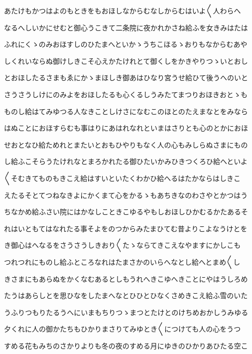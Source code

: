 \documentclass[a4paper,11pt,landscape]{ltjtarticle}
\begin{document}
\par\medskip
あたけもかつはよのもときをもおほしなからむなしからむはいよ〱人わらへ
\par\medskip
なるへしいかにせむと御心うこきて二条院に夜かれかさね給ふを女きみはたは
\par\medskip
ふれにくゝのみおほすしのひたまへといかゝうちこほるゝおりもなからむあや
\par\medskip
しくれいならぬ御けしきこそ心えかたけれとて御くしをかきやりつゝいとおし
\par\medskip
とおほしたるさまもゑにかゝまほしき御あはひなり宮うせ給ひて後うへのいと
\par\medskip
さうさうしけにのみよをおほしたるも心くるしうみたてまつりおほきおとゝも
\par\medskip
ものし給はてみゆつる人なきことしけさになむこのほとのたえまなとをみなら
\par\medskip
はぬことにおほすらむも事はりにあはれなれといまはさりとも心のとかにおほ
\par\medskip
せおとなひ給ためれとまたいとおもひやりもなく人の心もみしらぬさまにもの
\par\medskip
し給ふこそらうたけれなとまろかれたる御ひたいかみひきつくろひ給へといよ
\par\medskip
〱そむきてものもきこえ給はすいといたくわかひ給へるはたかならはしきこ
\par\medskip
えたるそとてつねなきよにかくまて心をかるゝもあちきなのわさやとかつはう
\par\medskip
ちなかめ給ふさい院にはかなしこときこゆるやもしおほしひかむるかたあるそ
\par\medskip
れはいともてはなれたる事そよをのつからみたまひてむ昔よりこよなうけとを
\par\medskip
き御心はへなるをさうさうしきおり〱たゝならてきこえなやますにかしこも
\par\medskip
つれつれにものし給ふところなれはたまさかのいらへなとし給へとまめ〱し
\par\medskip
きさまにもあらぬをかくなむあるとしもうれへきこゆへきことにやはうしろめ
\par\medskip
たうはあらしとを思ひなをしたまへなとひひとひなくさめきこえ給ふ雪のいた
\par\medskip
うふりつもりたるうへにいまもちりつゝまつとたけとのけちめおかしうみゆる
\par\medskip
夕くれに人の御かたちもひかりまさりてみゆとき〱につけても人の心をうつ
\par\medskip
すめる花もみちのさかりよりも冬の夜のすめる月にゆきのひかりあひたる空こ
\par\medskip
\end{document}
